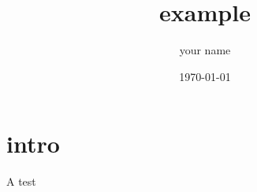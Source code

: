 \documentclass{article}
\title{example}
\author{your name}
\date{\today}
\begin{document}
\maketitle

\section{intro}
A test
\end{document}
